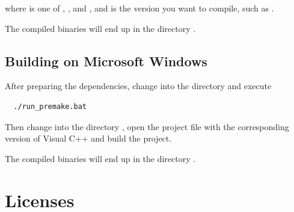 where  is one of ,
,  and
, and  is the version you
want to compile, such as .

The compiled binaries will end up in the directory .

\section{Building on Microsoft Windows}

After preparing the dependencies, change into the directory
 and execute

\begin{verbatim}
  ./run_premake.bat
\end{verbatim}

Then change into the directory , open the
project file with the corresponding version of Visual C++ and build
the project.

The compiled binaries will end up in the directory .

\chapter{Licenses}

\scriptsize

\normalsize

\scriptsize

\normalsize




